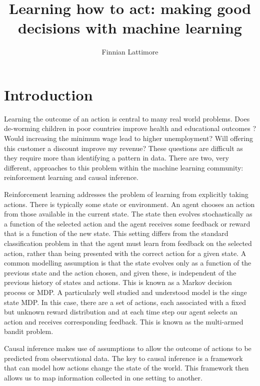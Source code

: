\documentclass[11pt,a4paper]{article}
\author{Finnian Lattimore}
\title{Learning how to act: making good decisions with machine learning}
\begin{document}
\def\ci{\perp\!\!\!\perp} %
\newtheorem{theorem}{Theorem}[section]
\newtheorem{definition}{Definition}[section]
\maketitle

\section{Introduction}

Learning the outcome of an action is central to many real world problems. Does de-worming children in poor countries improve health and educational outcomes \cite{miguel2004,davey2015}? Would increasing the minimum wage lead to higher unemployment? Will offering this customer a discount improve my revenue? These questions are difficult as they require more than identifying a pattern in data.  There are two, very different, approaches to this problem within the machine learning community: reinforcement learning and causal inference. 

Reinforcement learning addresses the problem of learning from explicitly taking actions. There is typically some state or environment. An agent chooses an action from those available in the current state. The state then evolves stochastically as a function of the selected action and the agent receives some feedback or reward that is a function of the new state. This setting differs from the standard classification problem in that the agent must learn from feedback on the selected action, rather than being presented with the correct action for a given state. A common modelling assumption is that the state evolves only as a function of the previous state and the action chosen, and given these, is independent of the previous history of states and actions. This is known as a Markov decision process or MDP.  A particularly well studied and understood model is the singe state MDP. In this case, there are a set of actions, each associated with a fixed but unknown reward distribution and at each time step our agent selects an action and receives corresponding feedback. This is known as the multi-armed bandit problem. 

Causal inference makes use of assumptions to allow the outcome of actions to be predicted from observational data. The key to causal inference is a framework that can model how actions change the state of the world. This framework then allows us to map information collected in one setting to another. 
\end{document}
